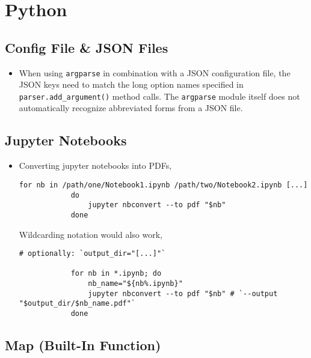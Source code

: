 \documentclass[12pt, a4paper]{article}
\numberwithin{equation}{section}
\theoremstyle{definition}
\theoremstyle{definition}
\begin{document}
	\newpage 
	
	\section{Python}
	
	\subsection{Config File \& JSON Files}
	
	\begin{itemize}
		\item  When using \texttt{argparse} in combination with a JSON configuration file, the JSON keys need to match the long option names specified in \texttt{parser.add\_argument()} method calls. The \texttt{argparse} module itself does not automatically recognize abbreviated forms from a JSON file.
	\end{itemize} 

	\subsection{Jupyter Notebooks}
	\begin{itemize}
		\item Converting jupyter notebooks into PDFs,
		
		\begin{lstlisting}[style=mystylepython, label=alg:notebooks_to_pdf, xleftmargin=\parindent]
			for nb in /path/one/Notebook1.ipynb /path/two/Notebook2.ipynb [...]
			do
				jupyter nbconvert --to pdf "$nb"
			done 
		\end{lstlisting}
	
		Wildcarding notation would also work, 
		
		\begin{lstlisting}[style=mystylepython, label=alg:notebooks_to_pdf__wildcard, xleftmargin=\parindent]
			# optionally: `output_dir="[...]"`
			
			for nb in *.ipynb; do
				nb_name="${nb%.ipynb}"
				jupyter nbconvert --to pdf "$nb" # `--output "$output_dir/$nb_name.pdf"`
			done 
		\end{lstlisting}
		
	\end{itemize}
	
	\subsection{Map (Built-In Function)}
	
\end{document}
